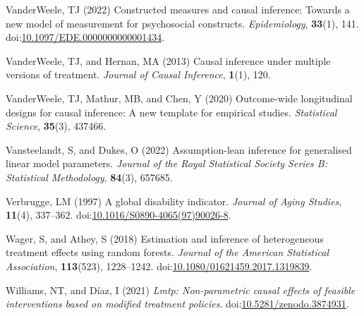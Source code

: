 \documentclass[
  singlecolumn]{article}
\newlength{\cslhangindent}
\newenvironment{CSLReferences}[2] %
 {\begin{list}{}{%
  \setlength{\itemindent}{0pt}
  \setlength{\leftmargin}{0pt}
  \setlength{\parsep}{0pt}
  \ifodd #1
   \setlength{\leftmargin}{\cslhangindent}
   \setlength{\itemindent}{-1\cslhangindent}
  \fi
  \setlength{\itemsep}{#2\baselineskip}}}
 {\end{list}}
\begin{document}
\begin{CSLReferences}{1}{0}
VanderWeele, TJ (2022) Constructed measures and causal inference:
Towards a new model of measurement for psychosocial constructs.
\emph{Epidemiology}, \textbf{33}(1), 141.
doi:\href{https://doi.org/10.1097/EDE.0000000000001434}{10.1097/EDE.0000000000001434}.

VanderWeele, TJ, and Hernan, MA (2013) Causal inference under multiple
versions of treatment. \emph{Journal of Causal Inference},
\textbf{1}(1), 120.

VanderWeele, TJ, Mathur, MB, and Chen, Y (2020) Outcome-wide
longitudinal designs for causal inference: A new template for empirical
studies. \emph{Statistical Science}, \textbf{35}(3), 437466.

Vansteelandt, S, and Dukes, O (2022) Assumption-lean inference for
generalised linear model parameters. \emph{Journal of the Royal
Statistical Society Series B: Statistical Methodology}, \textbf{84}(3),
657685.

Verbrugge, LM (1997) A global disability indicator. \emph{Journal of
Aging Studies}, \textbf{11}(4), 337--362.
doi:\href{https://doi.org/10.1016/S0890-4065(97)90026-8}{10.1016/S0890-4065(97)90026-8}.

Wager, S, and Athey, S (2018) Estimation and inference of heterogeneous
treatment effects using random forests. \emph{Journal of the American
Statistical Association}, \textbf{113}(523), 1228--1242.
doi:\href{https://doi.org/10.1080/01621459.2017.1319839}{10.1080/01621459.2017.1319839}.

Williams, NT, and Díaz, I (2021) \emph{Lmtp: Non-parametric causal
effects of feasible interventions based on modified treatment policies}.
doi:\href{https://doi.org/10.5281/zenodo.3874931}{10.5281/zenodo.3874931}.

\end{CSLReferences}
\end{document}
